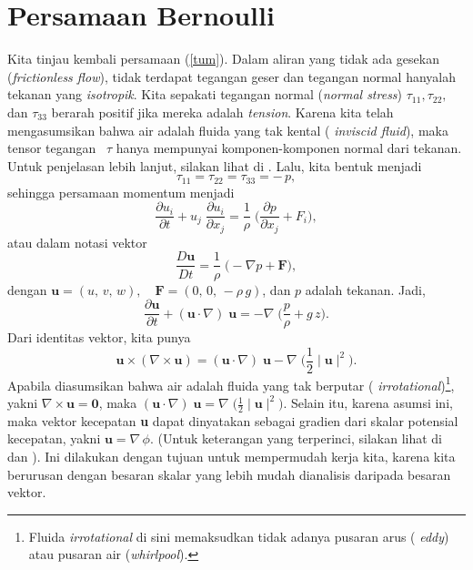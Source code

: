 \documentclass[12pt,a4paper]{report}
\begin{document}
\section{Persamaan Bernoulli}

\label{bernoulli}

Kita tinjau kembali persamaan (\ref{tum}). Dalam aliran yang tidak ada
gesekan (\textit{frictionless flow}), tidak terdapat tegangan geser dan
tegangan normal hanyalah tekanan yang \textit{isotropik}. Kita sepakati
tegangan normal (\textit{normal stress}) $\tau_{11}, \tau_{22},$ dan $%
\tau_{33}$ berarah positif jika mereka adalah \textit{tension}. Karena kita
telah mengasumsikan bahwa air adalah fluida yang tak kental (\textit{%
inviscid fluid}), maka tensor tegangan \mbox{\boldmath
$\tau$} hanya mempunyai komponen-komponen normal dari tekanan. Untuk
penjelasan lebih lanjut, silakan lihat di \cite{hwf,kjp,njn}. Lalu, kita
bentuk menjadi
\begin{equation}
\tau_{11} = \tau_{22} = \tau_{33} = -\,p,
\end{equation}
sehingga persamaan momentum menjadi
\begin{equation}
\frac{\partial u_{i} }{\partial t}+u_{j}\;\frac{\partial u_{i}}{\partial
x_{j}}=\frac{1}{\rho}\;\Bigg(\frac{\partial p}{\partial x_{j}}+F_{i}\Bigg),
\end{equation}
atau dalam notasi vektor
\begin{equation}
\frac{D \mathbf{u}}{Dt}=\frac{1}{\rho}\;\Bigg(-\nabla p + \mathbf{F}\Bigg),
\end{equation}
dengan $\mathbf{u}=(u,\,v,\,w), \quad \mathbf{F}=(0,\,0,\,-\rho\,g)$, dan $p$
adalah tekanan. Jadi,
\begin{equation}
\frac{\partial \mathbf{u}}{\partial t}+(\mathbf{u}\cdot\nabla)\;\mathbf{u}%
=-\nabla\;\Bigg(\frac{p}{\rho}+ g\,z\Bigg).
\end{equation}
Dari identitas vektor, kita punya
\begin{equation}
\mathbf{u}\times(\nabla\times\mathbf{u})= (\mathbf{u}\cdot\nabla)\;\mathbf{u}%
-\nabla\;\Bigg( \frac{1}{2}\mid\mathbf{u}\mid^2\Bigg).
\end{equation}
Apabila diasumsikan bahwa air adalah fluida yang tak berputar (\textit{%
irrotational})\footnote[1]{%
Fluida \textit{irrotational} di sini memaksudkan tidak adanya pusaran arus (%
\textit{eddy}) atau pusaran air (\textit{whirlpool}).}, yakni $\nabla \times
\mathbf{u} = \mathbf{0} \label{curl}$, maka $\displaystyle(\mathbf{u}%
\cdot\nabla)\;\mathbf{u}=\nabla\;\Bigg(
\frac{1}{2}\mid\mathbf{u}\mid^2\Bigg).$ Selain itu, karena asumsi ini, maka
vektor kecepatan \textbf{u} dapat dinyatakan sebagai gradien dari skalar
potensial kecepatan, yakni $\mathbf{u}=\nabla\,\phi$. (Untuk keterangan yang
terperinci, silakan lihat di \cite{drg} dan \cite{lld}). Ini dilakukan
dengan tujuan untuk mempermudah kerja kita, karena kita berurusan dengan
besaran skalar yang lebih mudah dianalisis daripada besaran vektor.
\end{document}

